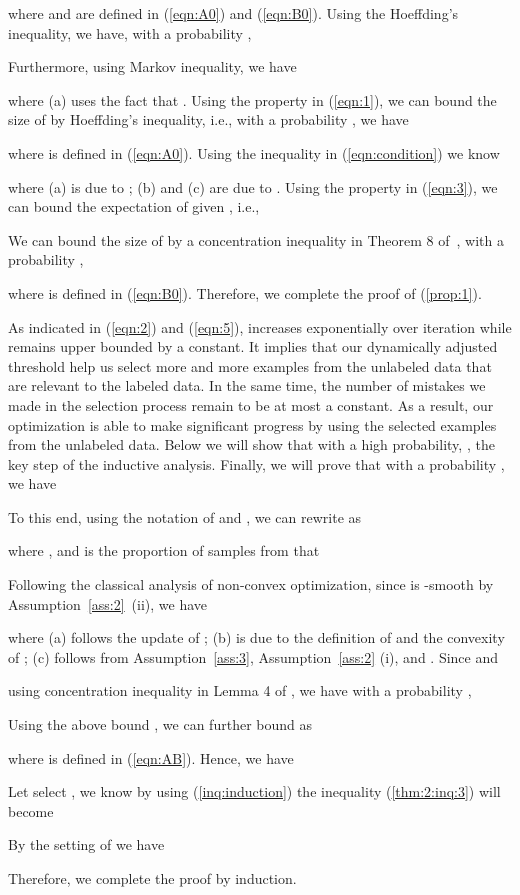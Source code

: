 \documentclass{article}
\begin{document}
where  and  are defined in (\ref{eqn:A0}) and (\ref{eqn:B0}).
Using the Hoeffding's inequality, 
we have, with a probability ,

Furthermore, using Markov inequality, 
we have

where (a) uses the fact that . Using the property in (\ref{eqn:1}), we can bound the size of  by Hoeffding's inequality, 
i.e., with a probability , we have

where  is defined in (\ref{eqn:A0}). 
Using the inequality in (\ref{eqn:condition}) we know

where (a) is due to ; (b) and (c) are due to .
Using the property in (\ref{eqn:3}), we can bound the expectation of  given , i.e.,

We can bound the size of  by a concentration inequality in Theorem 8 of~\citep{chung2006concentration}, 
with a probability ,

where  is defined in (\ref{eqn:B0}). Therefore, we complete the proof of (\ref{prop:1}).

As indicated in (\ref{eqn:2}) and (\ref{eqn:5}),  increases exponentially over iteration while  remains upper bounded by a constant. It implies that our dynamically adjusted threshold help us select more and more examples from the unlabeled data that are relevant to the labeled data. In the same time, the number of mistakes we made in the selection process remain to be at most a constant. As a result, our optimization is able to make significant progress by using the selected examples from the unlabeled data. Below we will show that with a high probability, , the key step of the inductive analysis. 
Finally, we will prove that with a probability , we have


To this end, using the notation of  and , we can rewrite  as

where , and  is the proportion of samples from  that

Following the classical analysis of non-convex optimization, since  is -smooth by Assumption~\ref{ass:2}~(ii), we have

where (a) follows the update of ;  (b) is due to the definition of  and the convexity of ; (c) follows from Assumption~\ref{ass:3}, Assumption~\ref{ass:2} (i), and . Since  and

using concentration inequality in Lemma 4 of \citep{ghadimi2016mini}, 
we have with a probability ,

Using the above bound , we can further bound  as

where  is defined in (\ref{eqn:AB}). Hence, we have

Let select 
,
we know by using (\ref{inq:induction}) the inequality (\ref{thm:2:inq:3}) will become

By the setting of  
we have

Therefore, we complete the proof by induction.
\end{document}
